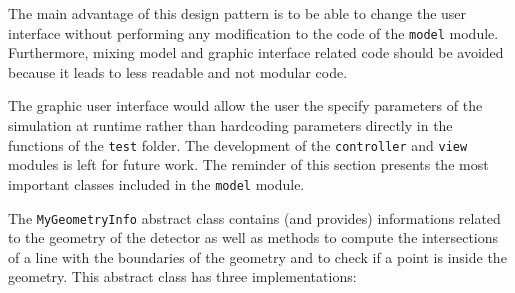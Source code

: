\documentclass[11pt]{article}
\begin{document}
\begin{enumerate}
The main advantage of this design pattern is to be able to change the user interface without
performing any modification to the code of the \texttt{model} module. Furthermore,
mixing model and graphic interface related code should be avoided because it leads to
less readable and not modular code.

The graphic user interface would allow the user the specify
parameters of the simulation at runtime rather than hardcoding parameters
directly in the functions of the \texttt{test} folder.
The development of the \texttt{controller} and \texttt{view} modules
is left for future work. The reminder of this section presents the most important classes
included in the \texttt{model} module.

The \texttt{MyGeometryInfo} abstract class contains (and provides) informations
related to the
geometry of the detector as well as methods to compute the intersections of a
line with the boundaries of the geometry and to check if a point is inside
the geometry. This abstract class has three implementations:

\end{enumerate}
\end{document}
